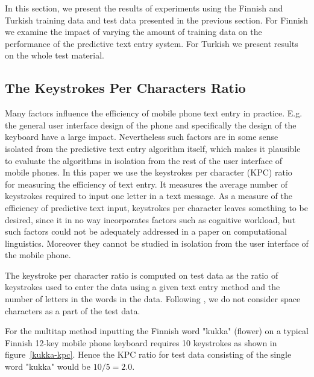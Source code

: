 \documentclass{llncs}
\begin{document}
In this section, we present the results of experiments using the
Finnish and Turkish training data and test data presented in the
previous section. For Finnish we examine the impact of varying the
amount of training data on the performance of the predictive text
entry system. For Turkish we present results on the whole test
material.

\subsection{The Keystrokes Per Characters Ratio}

Many factors influence the efficiency of mobile phone text entry in
practice. E.g. the general user interface design of the phone and
specifically the design of the keyboard have a large
impact. Nevertheless such factors are in some sense isolated from the
predictive text entry algorithm itself, which makes it plausible to
evaluate the algorithms in isolation from the rest of the user
interface of mobile phones. In this paper we use the keystrokes per
character (KPC) ratio~\cite{MacKenzie02kspc} for measuring the
efficiency of text entry. It measures the average number of keystrokes
required to input one letter in a text message. As a measure of the
efficiency of predictive text input, keystrokes per character leaves
something to be desired, since it in no way incorporates factors such
as cognitive workload, but such factors could not be adequately
addressed in a paper on computational linguistics. Moreover they
cannot be studied in isolation from the user interface of the mobile
phone.

The keystroke per character ratio is computed on test data as the
ratio of keystrokes used to enter the data using a given text entry
method and the number of letters in the words in the data. Following
\cite{Tantug:2010}, we do not consider space characters as a part of
the test data.

For the multitap method inputting the Finnish word "kukka" (flower) on
a typical Finnish 12-key mobile phone keyboard requires 10 keystrokes
as shown in figure~\ref{kukka-kpc}. Hence the KPC ratio for test data
consisting of the single word "kukka" would be $10/5 = 2.0$.
\end{document}
